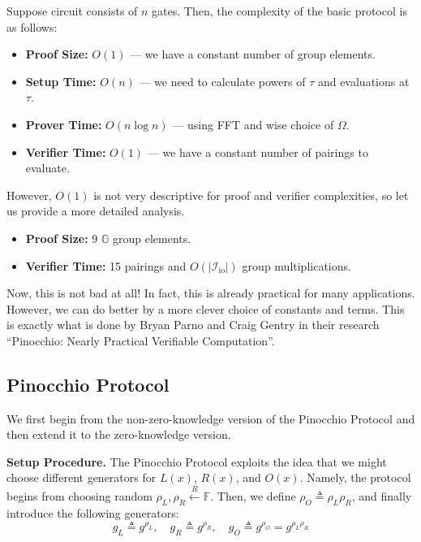 \documentclass[../lecture-notes.tex]{subfiles}
\begin{document}
\begin{proposition}
    Suppose circuit consists of $n$ gates. Then, the complexity of the basic protocol is as follows:
    \begin{itemize}
        \item \textbf{Proof Size:} $O(1)$ --- we have a constant number of group elements.
        \item \textbf{Setup Time:} $O(n)$ --- we need to calculate powers of $\tau$ and evaluations at $\tau$.
        \item \textbf{Prover Time:} $O(n \log n)$ --- using FFT and wise choice of $\Omega$.
        \item \textbf{Verifier Time:} $O(1)$ --- we have a constant number of pairings to evaluate.
    \end{itemize}

    However, $O(1)$ is not very descriptive for proof and verifier complexities, so let us provide a more detailed analysis. 
    \begin{itemize}
        \item \textbf{Proof Size:} 9 $\mathbb{G}$ group elements.
        \item \textbf{Verifier Time:} 15 pairings and $O(|\mathcal{I}_{\text{io}}|)$ group multiplications.
    \end{itemize}
\end{proposition}

Now, this is not bad at all! In fact, this is already practical for many applications. However, we can do better by a more clever choice of constants and terms. This is exactly what is done by Bryan Parno and Craig Gentry in their research ``Pinocchio: Nearly Practical Verifiable Computation''.

\subsection{Pinocchio Protocol}

We first begin from the non-zero-knowledge version of the Pinocchio Protocol and then extend it to the zero-knowledge version.

\textcolor{blue!75!gray}{\textbf{Setup Procedure.}} The Pinocchio Protocol exploits the idea that we might 
choose different generators for $L(x)$, $R(x)$, and $O(x)$. 
Namely, the protocol begins from choosing random $\rho_L,\rho_R \xleftarrow{R} \mathbb{F}$. 
Then, we define $\rho_O \triangleq \rho_L\rho_R$, and finally introduce the following generators:
\begin{equation*}
    g_L \triangleq g^{\rho_L}, \quad g_R \triangleq g^{\rho_R}, \quad g_O \triangleq g^{\rho_O} = g^{\rho_L\rho_R}
\end{equation*}
\end{document}
